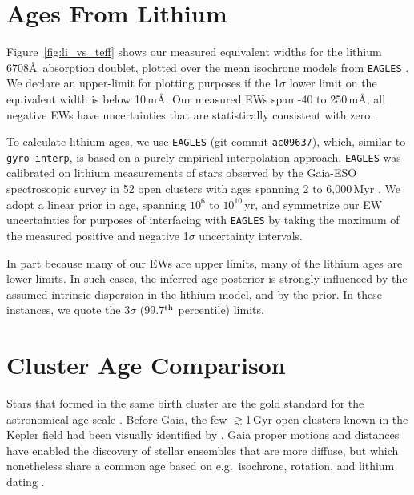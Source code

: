 \documentclass[11pt,twocolumn,tighten]{aastex63}
\begin{document}
\section{Ages From Lithium}
\label{sec:liage}

Figure~\ref{fig:li_vs_teff} shows our measured equivalent widths for
the lithium 6708\AA\ absorption doublet, plotted over the mean
isochrone models from \texttt{EAGLES} \citep{Jeffries_2023}.  We
declare an upper-limit for plotting purposes if the 1$\sigma$ lower
limit on the equivalent width is below 10\,m\AA.  Our measured EWs
span -40 to 250\,m\AA; all negative EWs have uncertainties that are
statistically consistent with zero.

To calculate lithium ages, we use \texttt{EAGLES} (git commit
\texttt{ac09637}), which, similar to \texttt{gyro-interp}, is based on
a purely empirical interpolation approach.  \texttt{EAGLES} 
was calibrated on lithium measurements of stars observed by the
Gaia-ESO spectroscopic survey in 52 open clusters with ages spanning 2
to 6{,}000\,Myr \citep{Jeffries_2023}.  We adopt a linear prior in
age, spanning $10^6$ to $10^{10}$\,yr, and symmetrize our EW
uncertainties for purposes of interfacing with \texttt{EAGLES} by
taking the maximum of the measured positive and negative 1$\sigma$
uncertainty intervals.

In part because many of our EWs are upper limits, many of the lithium
ages are lower limits.  In such cases,  the inferred age posterior is
strongly influenced by the assumed intrinsic dispersion in
the lithium model, and by the prior.  In these instances, we
quote the 3$\sigma$ (99.7$^{\rm th}$ percentile) limits.




\section{Cluster Age Comparison}
\label{sec:litagecomparison}

Stars that formed in the same birth cluster 
are the gold standard for the astronomical age scale
\citep{Soderblom_2010}.
Before Gaia, the few $\gtrsim$1\,Gyr open clusters
known in the Kepler field had been visually identified by
\citet{1864RSPT..154....1H}.
Gaia proper motions and distances 
have enabled the discovery of stellar ensembles that are more diffuse,
but which nonetheless
share a common age 
based on e.g.~isochrone, rotation, and lithium dating
\cite[e.g.][]{2019AJ....158..122K,Bouma_2022b,Barber_2022}.
\end{document}
